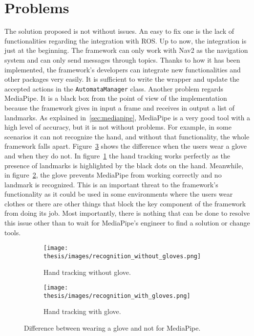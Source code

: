 \documentclass[../thesis.tex]{subfiles}
\begin{document}
\section{Problems}
The solution proposed is not without issues. An easy to fix one is the lack of functionalities regarding the integration with \gls{ROS}. Up to now, the integration is just at the beginning. The framework can only work with Nav2 as the navigation system and can only send messages through topics. Thanks to how it has been implemented, the framework's developers can integrate new functionalities and other packages very easily. It is sufficient to write the wrapper and update the accepted actions in the \texttt{AutomataManager} class.
Another problem regards MediaPipe. It is a black box from the point of view of the implementation because the framework gives in input a frame and receives in output a list of landmarks. As explained in~\ref{sec:mediapipe}, MediaPipe is a very good tool with a high level of accuracy, but it is not without problems. For example, in some scenarios it can not recognize the hand, and without that functionality, the whole framework falls apart. Figure~\ref{fig:ht_with_and_without_glove} shows the difference when the users wear a glove and when they do not. In figure~\ref{fig:ht_without_gloves} the hand tracking works perfectly as the presence of landmarks is highlighted by the black dots on the hand. Meanwhile, in figure~\ref{fig:ht_with_gloves}, the glove prevents MediaPipe from working correctly and no landmark is recognized. This is an important threat to the framework's functionality as it could be used in some environments where the users wear clothes or there are other things that block the key component of the framework from doing its job. Most importantly, there is nothing that can be done to resolve this issue other than to wait for MediaPipe's engineer to find a solution or change tools.
\begin{figure}
    \centering
    \begin{subfigure}[b]{1\textwidth}
        \centering
        \texttt{[image: thesis/images/recognition\_without\_gloves.png]}
        \caption{Hand tracking without glove.}
        \label{fig:ht_without_gloves}
    \end{subfigure}
    \hfill
    \begin{subfigure}[b]{1\textwidth}
        \centering
        \texttt{[image: thesis/images/recognition\_with\_gloves.png]}
        \caption{Hand tracking with glove.}
        \label{fig:ht_with_gloves}
    \end{subfigure}
    \caption{Difference between wearing a glove and not for MediaPipe.}
    \label{fig:ht_with_and_without_glove}
\end{figure}
\end{document}
